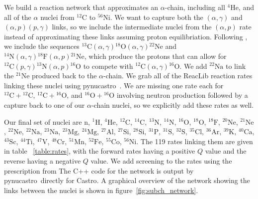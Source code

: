 \documentclass{aastex63}
\newcommand{\castro}{{\sf Castro}}
\newcommand{\pynucastro}{{\sf pynucastro}}
\newcommand{\isotm}[2]{{}^{#2}\mathrm{#1}}
\begin{document}
We build a reaction network that approximates an $\alpha$-chain,
including all $\isotm{He}{4}$, and all of the $\alpha$ nuclei from
$\isotm{C}{12}$ to $\isotm{Ni}{56}$.  We want to capture both the
$(\alpha,\gamma)$ and $(\alpha,p)(p,\gamma)$ links, so we include the
intermediate nuclei from the $(\alpha,p)$ rate instead of
approximating these links assuming proton equilibriation.  
Following \citet{shenbildsten}, we include the sequences
$\isotm{C}{13}(\alpha,\gamma)\isotm{O}{18}(\alpha,\gamma)\isotm{Ne}{22}$
and $\isotm{N}{14}(\alpha,\gamma)\isotm{F}{18}(\alpha,
p)\isotm{Ne}{21}$, which produce the protons that can allow for
$\isotm{C}{12}(p, \gamma)\isotm{N}{13}(\alpha, p)\isotm{O}{16}$ to compete
with $\isotm{C}{12}(\alpha,\gamma)\isotm{O}{16}$.  We add $\isotm{Na}{22}$
to link the $\isotm{Ne}{21}$ produced back to the $\alpha$-chain.  We grab
all of the ReacLib \citep{reaclib} reaction rates linking these nuclei using \pynucastro~\citep{pynucastro}.
We are missing one rate each for $\isotm{C}{12} + \isotm{C}{12}$,
$\isotm{C}{12} + \isotm{O}{16}$, and $\isotm{O}{16} + \isotm{O}{16}$
    involving neutron production followed by a capture back to one of
    our $\alpha$-chain nuclei, so we explicitly add these rates as
    well.

Our final set of nuclei are $\mathrm{n}$, ${}^{1}\mathrm{H}$,
${}^{4}\mathrm{He}$, ${}^{12}\mathrm{C}$, ${}^{14}\mathrm{C}$,
${}^{13}\mathrm{N}$, ${}^{14}\mathrm{N}$, ${}^{16}\mathrm{O}$,
${}^{18}\mathrm{O}$, ${}^{18}\mathrm{F}$, ${}^{20}\mathrm{Ne}$,
${}^{21}\mathrm{Ne}$, ${}^{22}\mathrm{Ne}$, ${}^{22}\mathrm{Na}$,
${}^{23}\mathrm{Na}$, ${}^{23}\mathrm{Mg}$, ${}^{24}\mathrm{Mg}$,
${}^{27}\mathrm{Al}$, ${}^{27}\mathrm{Si}$, ${}^{28}\mathrm{Si}$,
${}^{31}\mathrm{P}$, ${}^{31}\mathrm{S}$, ${}^{32}\mathrm{S}$,
${}^{35}\mathrm{Cl}$, ${}^{36}\mathrm{Ar}$, ${}^{39}\mathrm{K}$,
${}^{40}\mathrm{Ca}$, ${}^{43}\mathrm{Sc}$, ${}^{44}\mathrm{Ti}$,
${}^{47}\mathrm{V}$, ${}^{48}\mathrm{Cr}$, ${}^{51}\mathrm{Mn}$,
${}^{52}\mathrm{Fe}$, ${}^{55}\mathrm{Co}$, ${}^{56}\mathrm{Ni}$.  The 119
rates linking them are given in table ~\ref{table:rates}, with the
forward rates having a positive $Q$ value and the reverse having a
negative $Q$ value.  We add screening to the rates using the prescription
from The C++ code for the network is output by \pynucastro\
directly for \castro.  A graphical overview of the network showing the links
between the nuclei is shown in figure~\ref{fig:subch_network}.
\end{document}
